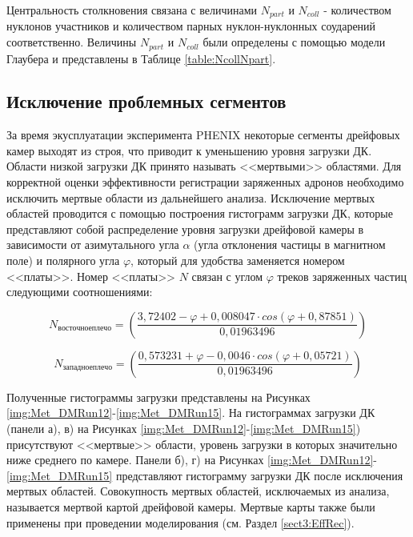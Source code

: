 Центральность столкновения связана с величинами $N_{part}$ и $N_{coll}$ - количеством нуклонов участников и количеством парных нуклон-нуклонных соударений соответственно. Величины $N_{part}$ и $N_{coll}$ были определены с помощью модели Глаубера и представлены в Таблице \ref{table:NcollNpart}.

\subsection{Исключение проблемных сегментов} \label{sect3_DM}
За время экусплуатации эксперимента PHENIX некоторые сегменты дрейфовых камер выходят из строя, что приводит к уменьшению уровня загрузки ДК. Области низкой загрузки ДК принято называть <<мертвыми>> областями. 
Для корректной оценки эффективности регистрации заряженных адронов необходимо исключить мертвые области из дальнейшего анализа. 
Исключение мертвых областей проводится с помощью построения гистограмм загрузки ДК, которые представляют собой распределение уровня загрузки дрейфовой камеры в зависимости от азимутального угла $\alpha$ (угла отклонения частицы в магнитном поле) и полярного угла $\varphi$, который для удобства заменяется номером <<платы>>. Номер <<платы>> $N$ связан с углом $\varphi$ треков заряженных частиц следующими соотношениями: 

\begin{equation}
	N_{восточное плечо} = \left( \frac{3,72402 - \varphi + 0,008047 \cdot cos(\varphi + 0,87851)}{0,01963496} \right)
\end{equation}


\begin{equation}
	N_{западное плечо} = \left( \frac{0,573231 + \varphi - 0,0046 \cdot cos(\varphi + 0,05721)}{0,01963496} \right)
\end{equation}

Полученные гистограммы загрузки представлены на Рисунках \ref{img:Met_DMRun12}-\ref{img:Met_DMRun15}. 
На гистограммах загрузки ДК (панели а), в) на Рисунках \ref{img:Met_DMRun12}-\ref{img:Met_DMRun15}) присутствуют <<мертвые>> области, уровень загрузки в которых значительно ниже среднего по камере. 
Панели б), г) на Рисунках \ref{img:Met_DMRun12}-\ref{img:Met_DMRun15} представляют гистограмму загрузки ДК после исключения мертвых областей. 
Совокупность мертвых областей, исключаемых из анализа, называется мертвой картой дрейфовой камеры. Мертвые карты также были применены при проведении моделирования (см. Раздел \ref{sect3:EffRec}).


